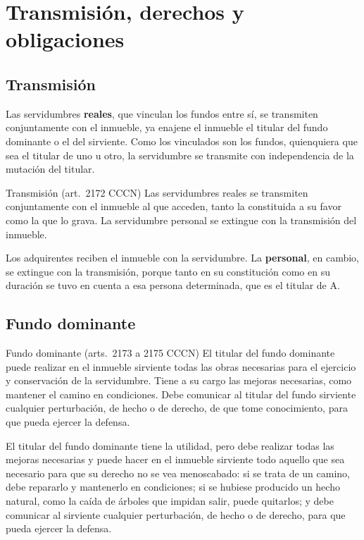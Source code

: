 \documentclass[12pt,oneside]{book}
\begin{document}
\section{Transmisión, derechos y obligaciones}

\subsection{Transmisión}

Las servidumbres \textbf{reales}, que vinculan los fundos entre sí, se transmiten conjuntamente con el inmueble, ya enajene el inmueble el titular del fundo dominante o el del sirviente. Como los vinculados son los fundos, quienquiera que sea el titular de uno u otro, la servidumbre se transmite con independencia de la mutación del titular.

\begin{regla}{Transmisión (art.~2172 CCCN)}
Las servidumbres reales se transmiten conjuntamente con el inmueble al que acceden, tanto la constituida a su favor como la que lo grava. La servidumbre personal se extingue con la transmisión del inmueble.
\end{regla}

Los adquirentes reciben el inmueble con la servidumbre. La \textbf{personal}, en cambio, se extingue con la transmisión, porque tanto en su constitución como en su duración se tuvo en cuenta a esa persona determinada, que es el titular de A.

\subsection{Fundo dominante}

\begin{regla}{Fundo dominante (arts.~2173 a 2175 CCCN)}
El titular del fundo dominante puede realizar en el inmueble sirviente todas las obras necesarias para el ejercicio y conservación de la servidumbre. Tiene a su cargo las mejoras necesarias, como mantener el camino en condiciones. Debe comunicar al titular del fundo sirviente cualquier perturbación, de hecho o de derecho, de que tome conocimiento, para que pueda ejercer la defensa.
\end{regla}

El titular del fundo dominante tiene la utilidad, pero debe realizar todas las mejoras necesarias y puede hacer en el inmueble sirviente todo aquello que sea necesario para que su derecho no se vea menoscabado: si se trata de un camino, debe repararlo y mantenerlo en condiciones; si se hubiese producido un hecho natural, como la caída de árboles que impidan salir, puede quitarlos; y debe comunicar al sirviente cualquier perturbación, de hecho o de derecho, para que pueda ejercer la defensa.
\end{document}
